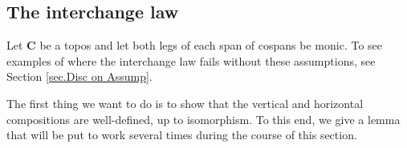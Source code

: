 \documentclass[11pt]{amsart}
\newcommand{\cat}[1]{\mathbf{#1}}
\theoremstyle{remark}
\theoremstyle{definition}
\begin{document}
\subsection{The interchange law}  %
%

Let $\cat{C}$ be a topos and let both legs of each span of cospans be monic. To see examples of where the interchange law fails without these assumptions, see Section \ref{sec.Disc on Assump}.

The first thing we want to do is to show that the vertical and horizontal compositions are well-defined, up to isomorphism. To this end, we give a lemma that will be put to work several times during the course of this section.
%
%
%
%
%
%
\end{document}

